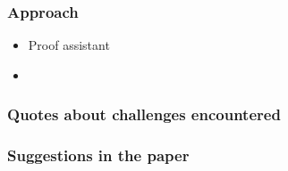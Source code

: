 \subsubsection{Approach}
\begin{itemize}
\item Proof assistant
\item 
\end{itemize}

\subsubsection{Quotes about challenges encountered}


\subsubsection{Suggestions in the paper}


